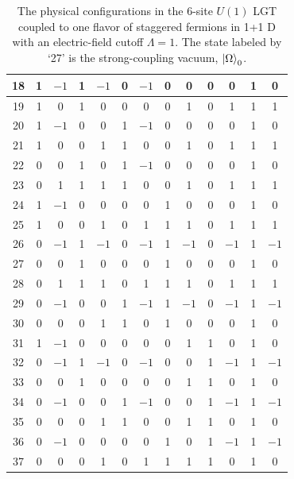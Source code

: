 \documentclass[a4paper,onecolumn,11pt,accepted=2024-10-11]{quantumarticle}
\begin{document}
\begin{table}[ht!]
\begin{tabular}{|c||*{12}{c|}}
18 & 1 & $-1$ & 1 & $-1$ & 0 & $-1$ & 0 & 0 & 0 & 0 & 1 & 0 \\ \hline
19 & 1 & 0 & 1 & 0 & 0 & 0 & 0 & 1 & 0 & 1 & 1 & 1 \\ \hline
20 & 1 & $-1$ & 0 & 0 & 1 & $-1$ & 0 & 0 & 0 & 0 & 1 & 0 \\ \hline
21 & 1 & 0 & 0 & 1 & 1 & 0 & 0 & 1 & 0 & 1 & 1 & 1 \\ \hline
22 & 0 & 0 & 1 & 0 & 1 & $-1$ & 0 & 0 & 0 & 0 & 1 & 0 \\ \hline
23 & 0 & 1 & 1 & 1 & 1 & 0 & 0 & 1 & 0 & 1 & 1 & 1 \\ \hline
24 & 1 & $-1$ & 0 & 0 & 0 & 0 & 1 & 0 & 0 & 0 & 1 & 0 \\ \hline
25 & 1 & 0 & 0 & 1 & 0 & 1 & 1 & 1 & 0 & 1 & 1 & 1 \\ \hline
26 & 0 & $-1$ & 1 & $-1$ & 0 & $-1$ & 1 & $-1$ & 0 & $-1$ & 1 & $-1$ \\ \hline
27 & 0 & 0 & 1 & 0 & 0 & 0 & 1 & 0 & 0 & 0 & 1 & 0 \\ \hline
28 & 0 & 1 & 1 & 1 & 0 & 1 & 1 & 1 & 0 & 1 & 1 & 1 \\ \hline
29 & 0 & $-1$ & 0 & 0 & 1 & $-1$ & 1 & $-1$ & 0 & $-1$ & 1 & $-1$ \\ \hline
30 & 0 & 0 & 0 & 1 & 1 & 0 & 1 & 0 & 0 & 0 & 1 & 0 \\ \hline
31 & 1 & $-1$ & 0 & 0 & 0 & 0 & 0 & 1 & 1 & 0 & 1 & 0 \\ \hline
32 & 0 & $-1$ & 1 & $-1$ & 0 & $-1$ & 0 & 0 & 1 & $-1$ & 1 & $-1$ \\ \hline
33 & 0 & 0 & 1 & 0 & 0 & 0 & 0 & 1 & 1 & 0 & 1 & 0 \\ \hline
34 & 0 & $-1$ & 0 & 0 & 1 & $-1$ & 0 & 0 & 1 & $-1$ & 1 & $-1$ \\ \hline
35 & 0 & 0 & 0 & 1 & 1 & 0 & 0 & 1 & 1 & 0 & 1 & 0 \\ \hline
36 & 0 & $-1$ & 0 & 0 & 0 & 0 & 1 & 0 & 1 & $-1$ & 1 & $-1$ \\ \hline
37 & 0 & 0 & 0 & 1 & 0 & 1 & 1 & 1 & 1 & 0 & 1 & 0 \\ \hline
\end{tabular}
    \caption{The physical configurations in the 6-site $U(1)$ LGT coupled to one flavor of staggered fermions in 1+1 D with an electric-field cutoff $\Lambda=1$. The state labeled by `27' is the strong-coupling vacuum, $\ket{\Omega}_0$.}
    \label{tab:physical_u1}
\end{table}
%
\end{document}
